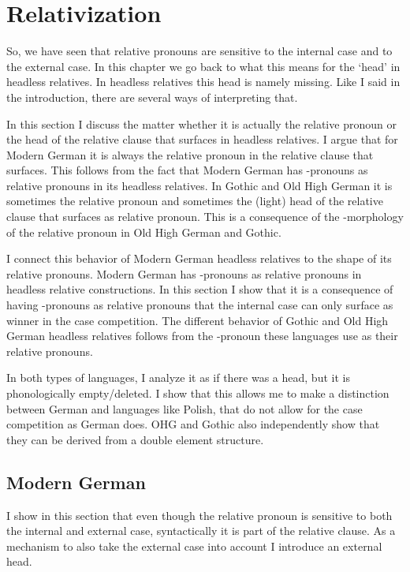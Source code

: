 
\chapter{Relativization}\label{ch:relativization}

So, we have seen that relative pronouns are sensitive to the internal case and to the external case. In this chapter we go back to what this means for the `head' in headless relatives. In headless relatives this head is namely missing. Like I said in the introduction, there are several ways of interpreting that.

In this section I discuss the matter whether it is actually the relative pronoun or the head of the relative clause that surfaces in headless relatives. I argue that for Modern German it is always the relative pronoun in the relative clause that surfaces. This follows from the fact that Modern German has -pronouns as relative pronouns in its headless relatives. In Gothic and Old High German it is sometimes the relative pronoun and sometimes the (light) head of the relative clause that surfaces as relative pronoun. This is a consequence of the -morphology of the relative pronoun in Old High German and Gothic.

I connect this behavior of Modern German headless relatives to the shape of its relative pronouns. Modern German has -pronouns as relative pronouns in headless relative constructions. In this section I show that it is a consequence of having -pronouns as relative pronouns that the internal case can only surface as winner in the case competition. The different behavior of Gothic and Old High German headless relatives follows from the -pronoun these languages use as their relative pronouns.

In both types of languages, I analyze it as if there was a head, but it is phonologically empty/deleted. I show that this allows me to make a distinction between German and languages like Polish, that do not allow for the case competition as German does. OHG and Gothic also independently show that they can be derived from a double element structure.


\section{Modern German}

I show in this section that even though the relative pronoun is sensitive to both the internal and external case, syntactically it is part of the relative clause. As a mechanism to also take the external case into account I introduce an external head.

